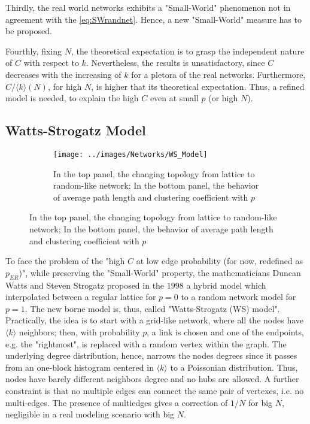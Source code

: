 \documentclass[a4paper,10pt]{book} %
\theoremstyle{definition}
\begin{document}
Thirdly, the real world networks exhibits a "Small-World" phenomenon not in agreement with the \autoref{eq:SWrandnet}. Hence, a new "Small-World" measure has to be proposed.

Fourthly, fixing $N$, the theoretical expectation is to grasp the independent nature of $C$ with respect to $k$. Nevertheless, the results is unsatisfactory, since $C$ decreases with the increasing of $k$ for a pletora of the real networks.
Furthermore, $C/\langle k \rangle (N)$, for high $N$, is higher that its theoretical expectation. Thus, a refined model is needed, to explain the high $C$ even at small $p$ (or high $N$).

\subsection{Watts-Strogatz Model}
\label{sec:WS_Model}
\begin{figure}[ht]
    \begin{subfigure}{\textwidth}
        \texttt{[image: ../images/Networks/WS\_Model]}
        \centering
        \caption{In the top panel, the changing topology from lattice to random-like network; In the bottom panel, the behavior of average path length and clustering coefficient with $p$ \cite{Olaf:2011_NonRandomBrain}}
        \label{fig:WSmodel}
    \end{subfigure}
\end{figure}

To face the problem of the "high $C$ at low edge probability (for now, redefined as $p_{ER}$)", while preserving the "Small-World" property, the mathematicians Duncan Watts and Steven Strogatz proposed in the $1998$ a hybrid model which interpolated between a regular lattice for $p = 0$ to a random network model for $p = 1$. The new borne model is, thus, called "Watts-Strogatz (WS) model".
Practically, the idea is to start with a grid-like network, where all the nodes have $\langle k \rangle$ neighbors; then, with probability $p$, a link is chosen and one of the endpoints, e.g. the "rightmost", is replaced with a random vertex within the graph. The underlying degree distribution, hence, narrows the nodes degrees since it passes from an one-block histogram centered in $\langle k \rangle$ to a Poissonian distribution. Thus, nodes have barely different neighbors degree and no hubs are allowed.
A further constraint is that no multiple edges can connect the same pair of vertexes, i.e. no multi-edges. The presence of multiedges gives a correction of $1/N$ for big $N$, negligible in a real modeling scenario with big $N$.
\end{document}
